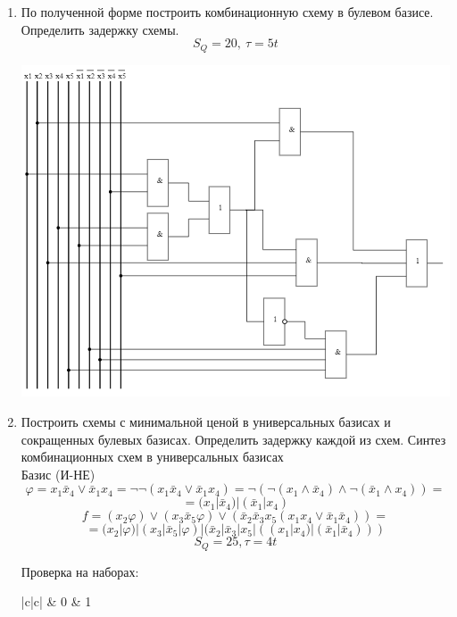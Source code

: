 \documentclass{article}
\begin{document}
\begin{enumerate}
       \item По полученной форме построить комбинационную схему в булевом базисе. Определить задержку схемы.
             $$ S_Q  = 20,\ τ=5t $$
             \begin{center}
                    \includegraphics[scale=0.4]{img2.png}
             \end{center}
       \item Построить схемы с минимальной ценой в универсальных базисах и сокращенных булевых базисах. Определить задержку каждой из схем.
             Синтез комбинационных схем в универсальных базисах
             \\ Базис (И-НЕ)
             $$φ= x_1\bar{x}_4 ∨ \bar{x}_1x_4 = ¬¬(x_1\bar{x}_4 ∨ \bar{x}_1x_4) = ¬(¬(x_1∧\bar{x}_4) ∧ ¬ (\bar{x}_1∧x_4)) =$$
             $$= (x_1 |\bar{x}_4) | (\bar{x}_1 | x_4)$$
             $$f =(x_2φ) ∨ (x_3\bar{x}_5φ) ∨ (\bar{x}_2\bar{x}_3x_5(x_1x_4 ∨ \bar{x}_1\bar{x}_4))=$$
             $$=(x_2|φ) | (x_3|\bar{x}_5|φ) | (\bar{x}_2|\bar{x}_3|x_5|((x_1|x_4)| (\bar{x}_1|\bar{x}_4)))$$
             $$S_Q  = 25, 	τ=4t$$
             
             Проверка на наборах:
             \begin{tabular}{|c|c|}     & 0  & 1 \nl
             \end{tabular}
             

\end{enumerate}
\end{document}

